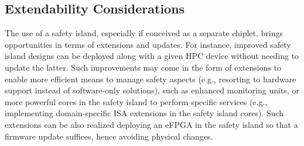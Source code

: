 \subsection{Extendability Considerations}


{\color{black}The use of a safety island, especially if conceived as a separate chiplet, brings opportunities in terms of extensions and updates. For instance, improved safety island designs can be deployed along with a given HPC device without needing to update the latter. Such improvements may come in the form of extensions to enable more efficient means to manage safety aspects (e.g., resorting to hardware support instead of software-only solutions), such as enhanced monitoring units, or more powerful cores in the safety island to perform specific services (e.g., implementing domain-specific ISA extensions in the safety island cores).
Such extensions can be also realized deploying an eFPGA in the safety island so that a firmware update suffices, hence avoiding physical changes.
}


